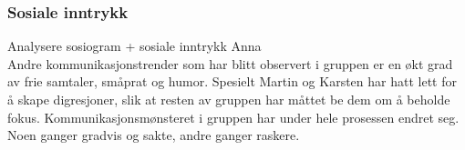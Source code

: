 \subsubsection{Sosiale inntrykk}

Analysere sosiogram + sosiale inntrykk Anna \\

Andre kommunikasjonstrender som har blitt observert i gruppen er en økt grad av frie samtaler, småprat og humor. Spesielt Martin og Karsten har hatt lett for å skape digresjoner, slik at resten av gruppen har måttet be dem om å beholde fokus. 
Kommunikasjonsmønsteret i gruppen har under hele prosessen endret seg.
Noen ganger gradvis og sakte, andre ganger raskere.